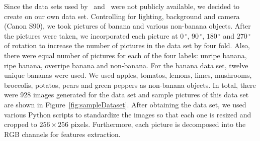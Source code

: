 \documentclass{article} %
\begin{document}
Since the data sets used by~\citet{saad2009recognizing} and~\citet{paulraj2009color} were not publicly available, we decided to create on our own data set. Controlling for lighting, background and camera (Canon S90), we took pictures of banana and various non-banana objects. After the pictures were taken, we incorporated each picture at $0\,^{\circ}$, $90\,^{\circ}$, $180\,^{\circ}$ and  $270\,^{\circ}$ of rotation to increase the number of pictures in the data set by four fold. Also, there were equal number of pictures for each of the four labels: unripe banana, ripe banana, overripe banana and non-banana. For the banana data set, twelve unique bananas were used. We used apples, tomatos, lemons, limes, mushrooms, broccolis, potatos, pears and green peppers as non-banana objects. In total, there were 928 images generated for the data set and sample pictures of this data set are shown in Figure~\ref{fig:sampleDataset}. After obtaining the data set, we used various Python scripts to standardize the images so that each one is resized and cropped to $256\times 256$ pixels. Furthermore, each picture is decomposed into the RGB channels for features extraction. 
\end{document}
